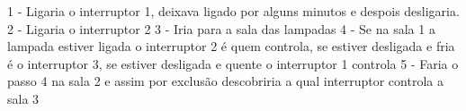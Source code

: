 1 - Ligaria o interruptor 1, deixava ligado por alguns minutos e despois desligaria.
2 - Ligaria o interruptor 2 
3 - Iria para a sala das lampadas
4 - Se na sala 1 a lampada estiver ligada o interruptor 2 é quem controla, se estiver desligada e fria é o interruptor 3, se estiver desligada e quente o interruptor 1 controla
5 - Faria o passo 4 na sala 2 e assim por exclusão descobriria a qual interruptor controla a sala 3
